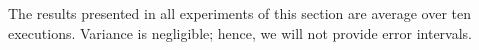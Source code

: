\documentclass[Ingles]{ic-tese-v1}
\begin{document}
The results presented  in all experiments of this  section are average
over  ten  executions. Variance  is  negligible;  hence, we  will  not
provide error intervals. 

\end{document}
